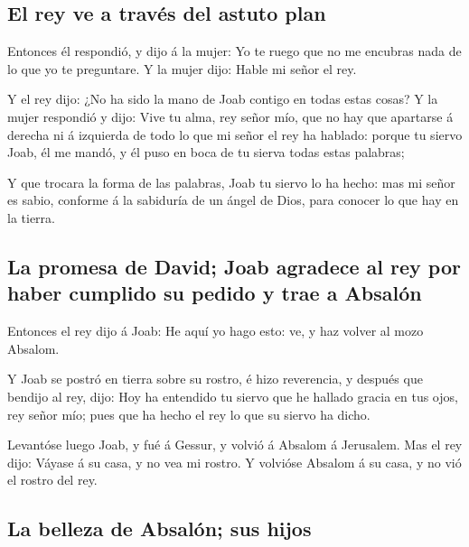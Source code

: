 \hypertarget{el-rey-ve-a-travuxe9s-del-astuto-plan}{%
\subsection{El rey ve a través del astuto
plan}\label{el-rey-ve-a-travuxe9s-del-astuto-plan}}

 Entonces él respondió, y dijo á la mujer: Yo te ruego que
no me encubras nada de lo que yo te preguntare. Y la mujer dijo: Hable
mi señor el rey.

 Y el rey dijo: ¿No ha sido la mano de Joab contigo en
todas estas cosas? Y la mujer respondió y dijo: Vive tu alma, rey señor
mío, que no hay que apartarse á derecha ni á izquierda de todo lo que mi
señor el rey ha hablado: porque tu siervo Joab, él me mandó, y él puso
en boca de tu sierva todas estas palabras;

 Y que trocara la forma de las palabras, Joab tu siervo lo
ha hecho: mas mi señor es sabio, conforme á la sabiduría de un ángel de
Dios, para conocer lo que hay en la tierra.

\hypertarget{la-promesa-de-david-joab-agradece-al-rey-por-haber-cumplido-su-pedido-y-trae-a-absaluxf3n}{%
\subsection{La promesa de David; Joab agradece al rey por haber cumplido
su pedido y trae a
Absalón}\label{la-promesa-de-david-joab-agradece-al-rey-por-haber-cumplido-su-pedido-y-trae-a-absaluxf3n}}

 Entonces el rey dijo á Joab: He aquí yo hago esto: ve, y
haz volver al mozo Absalom.

 Y Joab se postró en tierra sobre su rostro, é hizo
reverencia, y después que bendijo al rey, dijo: Hoy ha entendido tu
siervo que he hallado gracia en tus ojos, rey señor mío; pues que ha
hecho el rey lo que su siervo ha dicho.

 Levantóse luego Joab, y fué á Gessur, y volvió á Absalom á
Jerusalem.  Mas el rey dijo: Váyase á su casa, y no vea mi
rostro. Y volvióse Absalom á su casa, y no vió el rostro del rey.

\hypertarget{la-belleza-de-absaluxf3n-sus-hijos}{%
\subsection{La belleza de Absalón; sus
hijos}\label{la-belleza-de-absaluxf3n-sus-hijos}}

